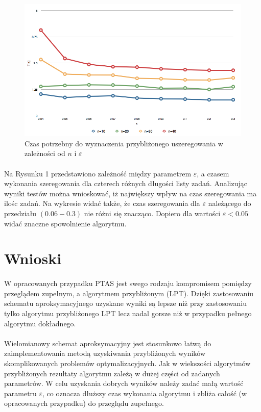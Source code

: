\documentclass[wide,a4paper,titlepage,12pt] {article}
\begin{document}
  \begin{figure}[h!\texttt{}]
    \begin{center}
      \includegraphics[width=\textwidth]{wyk.png}
      \caption{Czas potrzebny do wyznaczenia przybliżonego uszeregowania w zależności od $n$ i $\varepsilon$}
    \end{center}
  \end{figure}

  \paragraph{}
    Na Rysunku 1 przedstawiono zależność między parametrem $\varepsilon$, a czasem wykonania szeregowania dla czterech różnych długości listy zadań. Analizując wyniki testów można wnioskować, iż największy wpływ na czas szeregowania ma ilośc zadań. Na wykresie widać także, że czas szeregowania dla $\varepsilon$ należącego do przedziału $(0.06 - 0.3)$ nie różni się znacząco. Dopiero dla wartości $\varepsilon < 0.05$ widać znaczne spowolnienie algorytmu.


    \section{Wnioski}
    \paragraph{}
    W opracowanych przypadku PTAS jest swego rodzaju kompromisem pomiędzy przeglądem zupełnym, a algorytmem przybliżonym (LPT). Dzięki zastosowaniu schematu aproksymacyjnego uzyskane wyniki są lepsze niż przy zastosowaniu tylko algorytmu przybliżonego LPT lecz nadal gorsze niż w przypadku pełnego algorytmu dokładnego.
    \paragraph{}
    Wielomianowy schemat aproksymacyjny jest stosunkowo łatwą do zaimplementowania metodą uzyskiwania przybliżonych wyników skomplikowanych problemów optymalizacyjnych. Jak w wiekszości algorytmów przybliżonych rezultaty algorytmu zależą w dużej części od zadanych parametrów. W celu uzyskania dobrych wyników należy zadać małą wartość parametru $\varepsilon$, co oznacza dłuższy czas wykonania algorytmu i zbliża całość (w opracowanych przypadku) do przeglądu zupełnego.
\end{document}
